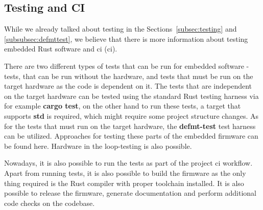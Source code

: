 \subsection{Testing and CI}
\label{subsec:testing_ci}
While we already talked about testing in the Sections~\ref{subsec:testing} and \ref{subsubsec:defmttest}, we believe that there is more information about testing embedded Rust software and \acs{ci} (\acl{ci}).

There are two different types of tests that can be run for embedded software - tests, that can be run without the hardware, and tests that must be run on the target hardware as the code is dependent on it.
The tests that are independent on the target hardware can be tested using the standard Rust testing harness via for example \textbf{cargo test}, on the other hand to run these tests, a target that supports \textbf{std} is required, which might require some project structure changes.
As for the tests that must run on the target hardware, the \textbf{defmt-test} test harness can be utilized.
Approaches for testing these parts of the embedded firmware can be found here\cite{aparicio_testing_nodate,aparicio_testing_nodate-1}.
Hardware in the loop-testing is also possible\cite{schievink_running_nodate}.

Nowadays, it is also possible to run the tests as part of the project \acs{ci} workflow.
Apart from running tests, it is also possible to build the firmware as the only thing required is the Rust compiler with proper toolchain installed\cite{vahter_release_nodate}.
It is also possible to release the firmware, generate documentation and perform additional code checks on the codebase\cite{chiovoloni_few_2020}.

